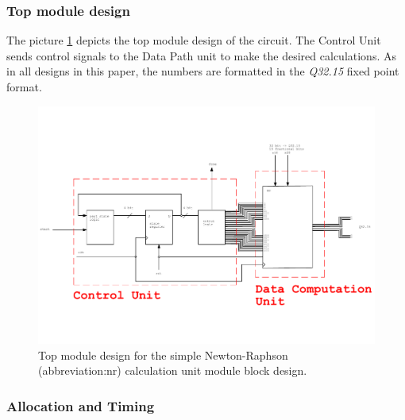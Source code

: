 \documentclass[a4paper, twoside, 11pt]{article}
\newcommand{\fbar}{\FloatBarrier}
\begin{document}
        \subsubsection{Top module design}
            The picture \ref{fig:simple-nr-top-module} depicts the top module design of the circuit. The Control Unit sends control signals to the Data Path unit to make the desired calculations. As in all designs in this paper, the numbers are formatted in the \textit{Q32.15} fixed point format.
            \begin{figure}[htbp!]
                \centering
                \includegraphics[width=1\textwidth]{src/pdf/simple-nr-top-module.pdf}
                \caption{Top module design for the simple Newton-Raphson (\gls{abbreviation:nr}) calculation unit module block design.}
                \label{fig:simple-nr-top-module}
            \end{figure}

        \fbar
        \subsubsection{Allocation and Timing}
            
\end{document}
